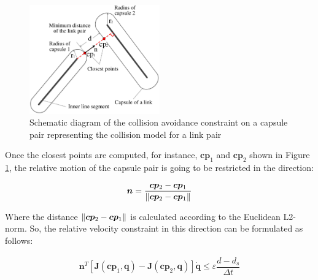 \begin{figure}[!ht]
    \centering
    \includegraphics[width=0.5\textwidth]{images/wholebody/link_pair}
    \caption{Schematic diagram of the collision avoidance constraint on a capsule pair representing the collision model for a link pair}\label{fig:link_pair}
    \vspace{-3mm}
\end{figure}

Once the closest points are computed, for instance, $ \bm{cp}_1 $ and $ \bm{cp}_2 $ shown in Figure \ref{fig:link_pair}, the relative motion of the capsule pair is going to be restricted in the direction:

\begin{equation} 
\label{eq:unit_vector}
\begin{array}{c}
\bm{n} = \dfrac{\bm{cp}_2-\bm{cp}_1}{\Arrowvert \bm{cp}_2-\bm{cp}_1 \Arrowvert} 
\end{array}
\end{equation}

Where the distance $ \Arrowvert \bm{cp}_2-\bm{cp}_1 \Arrowvert $ is calculated according to the Euclidean L2-norm. So, the relative velocity constraint in this direction can be formulated as follows:

\begin{equation} 
\label{eq:SCA_constraint}
\begin{array}{c}
\bm{n}^{T}[\bm{J}(\bm{cp}_1,\bm{q})-\bm{J}(\bm{cp}_2,\bm{q})]\dot{\bm{q}} \leq \varepsilon \dfrac{d-d_s}{\Delta t} 
\end{array}
\end{equation}
 
